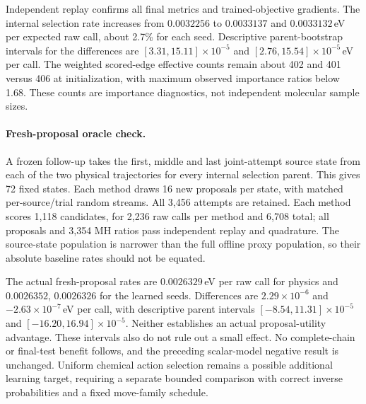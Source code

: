 Independent replay confirms all final metrics and trained-objective gradients.
The internal selection rate increases from $0.0032256$ to $0.0033137$ and
$0.0033132$\,eV per expected raw call, about 2.7\% for each seed. Descriptive
parent-bootstrap intervals for the differences are
$[3.31,15.11]\times10^{-5}$ and $[2.76,15.54]\times10^{-5}$\,eV per call.
The weighted scored-edge effective counts remain about 402 and 401 versus 406
at initialization, with maximum observed importance ratios below 1.68. These
counts are importance diagnostics, not independent molecular sample sizes.

\paragraph{Fresh-proposal oracle check.}
A frozen follow-up takes the first, middle and last joint-attempt source state
from each of the two physical trajectories for every internal selection parent.
This gives 72 fixed states. Each method draws 16 new proposals per state, with
matched per-source/trial random streams. All 3,456 attempts are retained. Each
method scores 1,118 candidates, for 2,236 raw calls per method and 6,708 total;
all proposals and 3,354 MH ratios pass independent replay and quadrature.
The source-state population is narrower than the full offline proxy population,
so their absolute baseline rates should not be equated.

The actual fresh-proposal rates are $0.0026329$\,eV per raw call for physics and
$0.0026352$, $0.0026326$ for the learned seeds. Differences are
$2.29\times10^{-6}$ and $-2.63\times10^{-7}$\,eV per call, with descriptive parent
intervals $[-8.54,11.31]\times10^{-5}$ and
$[-16.20,16.94]\times10^{-5}$. Neither establishes an actual proposal-utility
advantage. These intervals also do not rule out a small effect. No complete-chain
or final-test benefit follows, and the preceding scalar-model negative result is
unchanged. Uniform chemical action selection remains a possible additional
learning target, requiring a separate bounded comparison with correct inverse
probabilities and a fixed move-family schedule.
